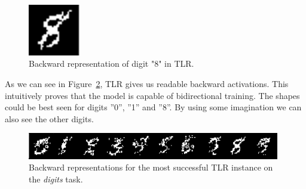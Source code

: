 \begin{figure}[H]
  \centering
  \includegraphics[width=0.2\textwidth]{img/tlr-digit-8.png} 
  \caption{Backward representation of digit "8" in TLR.}
  \label{fig:our-backward-repre-8}
\end{figure}

As we can see in Figure~\ref{fig:results-tlr-digits-backward}, TLR gives us readable backward activations. This intuitively proves that the model is capable of bidirectional training. The shapes could be best seen for digits ''0'', ''1'' and ''8''. By using some imagination we can also see the other digits. 

\begin{figure}[H]
  \centering
  \includegraphics[width=0.98\textwidth]{img/tlr-digits.png}    
  \caption{Backward representations for the most successful TLR instance on the \emph{digits} task.}
  \label{fig:results-tlr-digits-backward} 
\end{figure}
